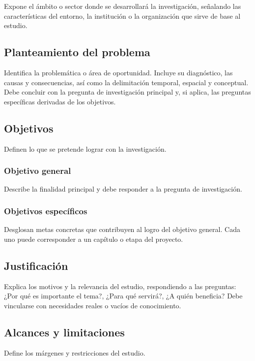 Expone el ámbito o sector donde se desarrollará la investigación, señalando las características del entorno, la institución o la organización que sirve de base al estudio.

\subsection{Planteamiento del problema}

Identifica la problemática o área de oportunidad. Incluye su diagnóstico, las causas y consecuencias, así como la delimitación temporal, espacial y conceptual. Debe concluir con la pregunta de investigación principal y, si aplica, las preguntas específicas derivadas de los objetivos.

\subsection{Objetivos}

Definen lo que se pretende lograr con la investigación.

\subsubsection{Objetivo general}

Describe la finalidad principal y debe responder a la pregunta de investigación.

\subsubsection{Objetivos específicos}

Desglosan metas concretas que contribuyen al logro del objetivo general. Cada uno puede corresponder a un capítulo o etapa del proyecto.

\subsection{Justificación}

Explica los motivos y la relevancia del estudio, respondiendo a las preguntas: ¿Por qué es importante el tema?, ¿Para qué servirá?, ¿A quién beneficia? Debe vincularse con necesidades reales o vacíos de conocimiento.

\subsection{Alcances y limitaciones}

Define los márgenes y restricciones del estudio.

